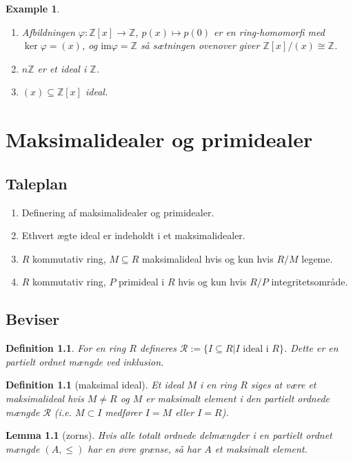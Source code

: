 \documentclass[10pt,twoside,openany,final]{memoir}
\theoremstyle{break}
\newtheorem{lemma}[section]{Lemma}
\newtheorem{definition}[section]{Definition}
\theoremstyle{Break}
\newtheorem{example}[section]{Example}
\newcommand{\Z}{\mathbb{Z}}
\begin{document}
\begin{example}
\begin{enumerate}
\item Afbildningen $\varphi \colon \Z[x] \to \Z$, $p(x) \mapsto p(0)$ er en ring-homomorfi med $\ker \varphi=(x)$, og $\textrm{im}\varphi=\Z$ så sætningen ovenover giver $\Z[x]/(x) \cong \Z$.
\item $n \Z$ er et ideal i $\Z$.
\item $(x) \subseteq \Z[x]$ ideal.
\end{enumerate}
\end{example}

\chapter{Maksimalidealer og primidealer}
\section*{Taleplan}
\begin{enumerate}
\item Definering af maksimalidealer og primidealer.
\item Ethvert ægte ideal er indeholdt i et maksimalidealer.
\item $R$ kommutativ ring, $M \subseteq R$ maksimalideal hvis og kun hvis $R/M$ legeme.
\item $R$ kommutativ ring, $P $ primideal i $R$ hvis og kun hvis $R/P$ integritetsområde.
\end{enumerate}
\section*{Beviser}
\begin{definition}
For en ring $R$ defineres $\mathcal{R}:=\{ I \subseteq R | I \text{ ideal i } R \}$. Dette er en partielt ordnet mængde ved inklusion.
\end{definition}
\begin{definition}[maksimal ideal]
Et ideal $M$ i en ring $R$ siges at være et maksimalideal hvis $M \neq R$ og $M$ er maksimalt element i den partielt ordnede mængde $\mathcal{R}$ (i.e. $M \subset I $ medfører $I = M$ eller $I = R$).
\end{definition}
\begin{lemma}[zorns]
Hvis alle totalt ordnede delmængder i en partielt ordnet mængde $(A,\leq)$ har en øvre grænse, så har $A$ et maksimalt element.
\end{lemma}
\end{document}
